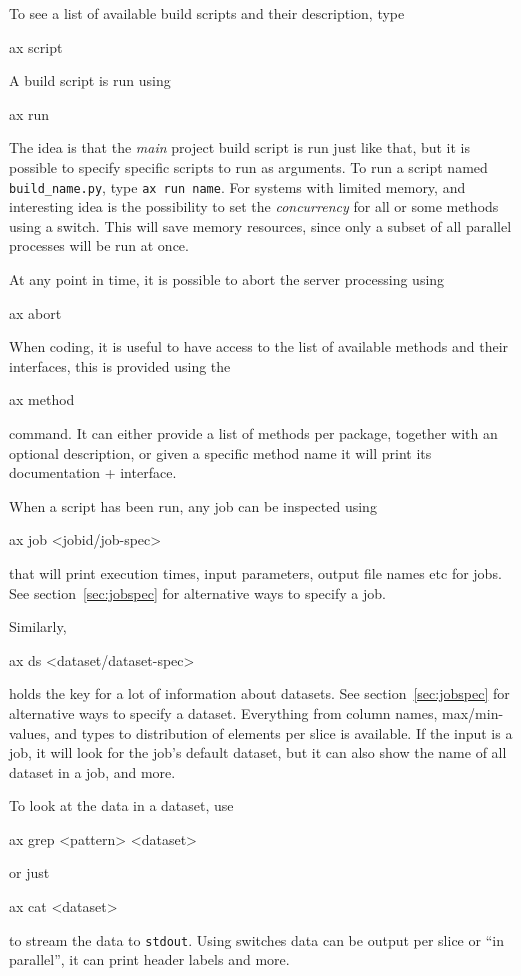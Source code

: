 To see a list of available build scripts and their description, type
\begin{shell}
ax script
\end{shell}

A build script is run using
\begin{shell}
ax run
\end{shell}
The idea is that the \textsl{main} project build script is run just
like that, but it is possible to specify specific scripts to run as
arguments.  To run a script named \texttt{build\_name.py}, type
\texttt{ax run name}.  For systems with limited memory, and
interesting idea is the possibility to set the \textsl{concurrency}
for all or some methods using a switch.  This will save memory
resources, since only a subset of all parallel processes will be run
at once.

At any point in time, it is possible to abort the server processing
using
\begin{shell}
ax abort
\end{shell}

When coding, it is useful to have access to the list of available
methods and their interfaces, this is provided using the
\begin{shell}
ax method
\end{shell}
command.  It can either provide a list of methods per package,
together with an optional description, or given a specific method name
it will print its documentation + interface.

When a script has been run, any job can be inspected using
\begin{shell}
ax job <jobid/job-spec>
\end{shell}
that will print execution times, input parameters, output file names
etc for jobs.  See section~\ref{sec:jobspec} for alternative ways to
specify a job.

Similarly,
\begin{shell}
ax ds <dataset/dataset-spec>
\end{shell}
holds the key for a lot of information about datasets.  See
section~\ref{sec:jobspec} for alternative ways to specify a dataset.
Everything from column names, max/min-values, and types to
distribution of elements per slice is available.  If the input is a
job, it will look for the job's default dataset, but it can also show
the name of all dataset in a job, and more.

To look at the data in a dataset, use
\begin{shell}
ax grep <pattern> <dataset>
\end{shell}
or just
\begin{shell}
ax cat <dataset>
\end{shell}
to stream the data to \texttt{stdout}.  Using switches data can be
output per slice or ``in parallel'', it can print header labels and
more.

